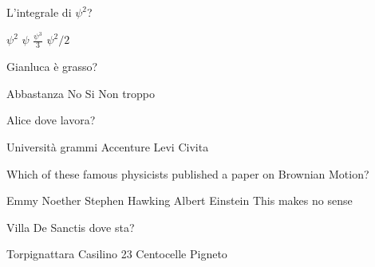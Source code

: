 \documentclass{exam}
\begin{document}
\begin{center}
\end{center}
\vspace{5mm}
\vspace{5mm}
\vspace{5mm}
\begin{questions}
\question[10] L'integrale di $\psi^{2}$?
\begin{choices}
\choice $\psi^{2}$
\choice $\psi$
\choice $\frac{\psi^{3}}{3}$
\choice $\psi^{2}/2$
\end{choices}
\question[10] Gianluca è grasso?
\begin{choices}
\choice Abbastanza
\choice No
\choice Si
\choice Non troppo
\end{choices}
\question[10] Alice dove lavora?
\begin{choices}
\choice Università
 grammi
\choice Accenture
\choice Levi Civita
\end{choices}
\question[10] Which of these famous physicists published a paper on Brownian Motion?
\begin{choices}
\choice Emmy Noether
\choice Stephen Hawking 
\choice Albert Einstein
\choice This makes no sense
\end{choices}
\question[10] Villa De Sanctis dove sta?
\begin{choices}
\choice Torpignattara
\choice Casilino 23
\choice Centocelle
\choice Pigneto
\end{choices}
\end{questions}
           
\end{document}
